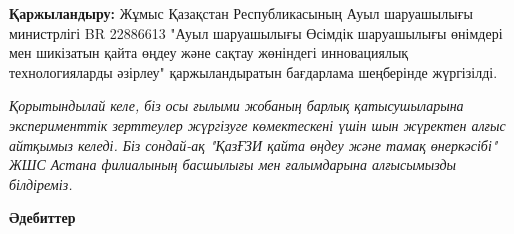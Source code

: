 \begin{multicols}{2}
{\bfseries Қаржыландыру:} Жұмыс Қазақстан Республикасының Ауыл шаруашылығы
министрлігі BR 22886613 "Ауыл шаруашылығы Өсімдік шаруашылығы өнімдері
мен шикізатын қайта өңдеу және сақтау жөніндегі инновациялық
технологияларды әзірлеу" қаржыландыратын бағдарлама шеңберінде
жүргізілді.

\emph{Қорытындылай келе, біз осы ғылыми жобаның барлық қатысушыларына
эксперименттік зерттеулер жүргізуге көмектескені үшін шын жүректен алғыс
айтқымыз келеді. Біз сондай-ақ "ҚазҒЗИ қайта өңдеу және тамақ
өнеркәсібі" ЖШС Астана филиалының басшылығы мен ғалымдарына алғысымызды
білдіреміз.}
\end{multicols}

\begin{center}
{\bfseries Әдебиттер}
\end{center}

